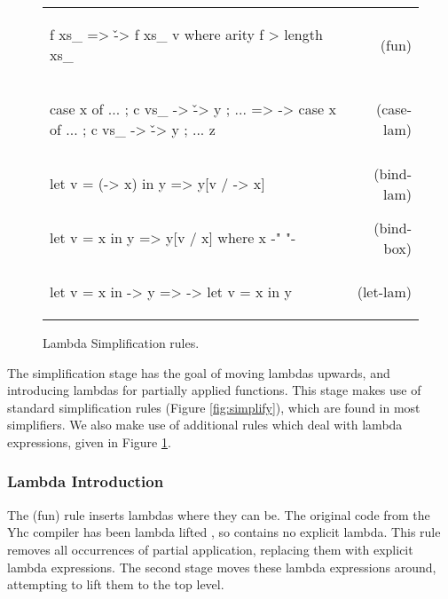 \documentclass[preprint]{sigplanconf}
\newcommand{\simp}[2]{\vspace{-7mm} #2 & (#1) \\}
\newenvironment{simplify}
    {\noindent
     \begin{flushright}
     \begin{tabular}{p{6.5cm}r}
    }
    {\end{tabular}
     \vspace{-7mm}
     \end{flushright}
    }
\begin{document}
\begin{figure}
\begin{simplify}

\simp{fun}{
\begin{code}
f xs_
    => \v -> f xs_ v
    where arity f > length xs_
\end{code}}

\simp{case-lam}{
\begin{code}
case x of {... ; c vs_ -> \v -> y ; ...}
    => \z -> case x of {... ; c vs_ -> \v -> y ; ...} z
\end{code}}

\simp{bind-lam}{
\begin{code}
let v = (\w -> x) in y
    => y[v / \w -> x]
\end{code}}

\simp{bind-box}{
\begin{code}
let v = x in y
    => y[v / x]
    where x {-" \text{ is a boxed lambda (see \S?)} "-}
\end{code}}

\simp{let-lam}{
\begin{code}
let v = x in \w -> y
    => \w -> let v = x in y
\end{code}}

\end{simplify}
\caption{Lambda Simplification rules.}
\label{fig:lambda_simplify}
\end{figure}

The simplification stage has the goal of moving lambdas upwards, and introducing lambdas for partially applied functions. This stage makes use of standard simplification rules (Figure \ref{fig:simplify}), which are found in most simplifiers. We also make use of additional rules which deal with lambda expressions, given in Figure \ref{fig:lambda_simplify}.

\subsubsection{Lambda Introduction}

The (fun) rule inserts lambdas where they can be. The original code from the Yhc compiler has been lambda lifted \cite{lambda_lift}, so contains no explicit lambda. This rule removes all occurrences of partial application, replacing them with explicit lambda expressions. The second stage moves these lambda expressions around, attempting to lift them to the top level.
\end{document}
